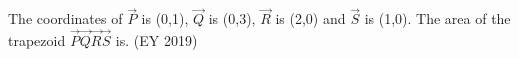 \item The coordinates of $\vec{P}$ is (0,1), $\vec{Q}$ is (0,3), $\vec{R}$ is (2,0) and $\vec{S}$ is (1,0). The area of the trapezoid $\vec{P}\vec{Q}\vec{R}\vec{S}$ is\underline{\hspace{1.5cm}}.
\hfill{(EY 2019)}
